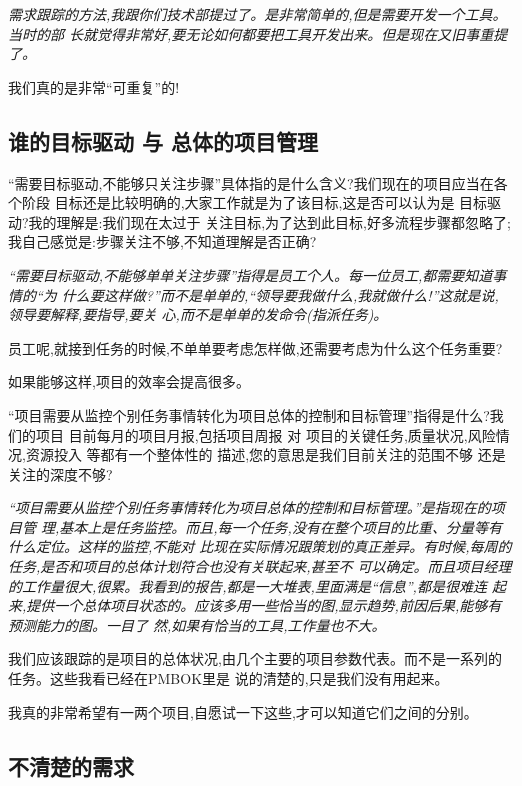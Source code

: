 \documentclass[11pt]{article}
\begin{document}
\ylogo \itshape 需求跟踪的方法,我跟你们技术部提过了。是非常简单的,但是需要开发一个工具。当时的部
  长就觉得非常好,要无论如何都要把工具开发出来。但是现在又旧事重提了。

我们真的是非常``可重复''的!

\subsection{谁的目标驱动 与 总体的项目管理}

\qlogo \rmfamily ``需要目标驱动,不能够只关注步骤''具体指的是什么含义?我们现在的项目应当在各个阶段
  目标还是比较明确的,大家工作就是为了该目标,这是否可以认为是 目标驱动?我的理解是:我们现在太过于
  关注目标,为了达到此目标,好多流程步骤都忽略了;我自己感觉是:步骤关注不够,不知道理解是否正确?

\ylogo \itshape ``需要目标驱动,不能够单单关注步骤''指得是员工个人。每一位员工,都需要知道事情的``为
  什么要这样做?''而不是单单的,``领导要我做什么,我就做什么!''这就是说,领导要解释,要指导,要关
  心,而不是单单的发命令(指派任务)。

员工呢,就接到任务的时候,不单单要考虑怎样做,还需要考虑为什么这个任务重要?

如果能够这样,项目的效率会提高很多。

\qlogo \rmfamily ``项目需要从监控个别任务事情转化为项目总体的控制和目标管理''指得是什么?我们的项目
  目前每月的项目月报,包括项目周报 对 项目的关键任务,质量状况,风险情况,资源投入 等都有一个整体性的
  描述,您的意思是我们目前关注的范围不够 还是 关注的深度不够? 

\ylogo \itshape ``项目需要从监控个别任务事情转化为项目总体的控制和目标管理。''是指现在的项目管
理,基本上是任务监控。而且,每一个任务,没有在整个项目的比重、分量等有什么定位。这样的监控,不能对
比现在实际情况跟策划的真正差异。有时候,每周的任务,是否和项目的总体计划符合也没有关联起来,甚至不
可以确定。而且项目经理的工作量很大,很累。我看到的报告,都是一大堆表,里面满是``信息'',都是很难连
起来,提供一个总体项目状态的。应该多用一些恰当的图,显示趋势,前因后果,能够有预测能力的图。一目了
然,如果有恰当的工具,工作量也不大。

我们应该跟踪的是项目的总体状况,由几个主要的项目参数代表。而不是一系列的任务。这些我看已经在PMBOK里是
说的清楚的,只是我们没有用起来。

我真的非常希望有一两个项目,自愿试一下这些,才可以知道它们之间的分别。

\subsection{不清楚的需求}\label{link6}
\end{document}
